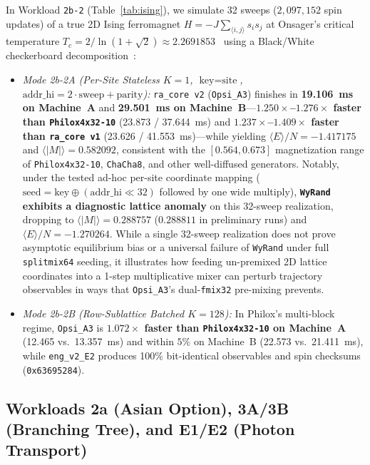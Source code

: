 \documentclass[conference]{IEEEtran}
\begin{document}
In Workload \texttt{2b-2} (Table~\ref{tab:ising}), we simulate 32 sweeps ($2{,}097{,}152$ spin updates) of a true 2D Ising ferromagnet $H = -J \sum_{\langle i,j \rangle} s_i s_j$ at Onsager's critical temperature $T_c = 2/\ln(1+\sqrt{2}) \approx 2.2691853$~\cite{onsager1944crystal} using a Black/White checkerboard decomposition~\cite{metropolis1953equation}:
\begin{itemize}
    \item \emph{Mode 2b-2A (Per-Site Stateless $K=1$, $\text{key}=\text{site}$, $\text{addr\_hi}=2\cdot\text{sweep}+\text{parity}$):} \texttt{ra\_core v2} (\texttt{Opsi\_A3}) finishes in \textbf{19.106~ms on Machine~A} and \textbf{29.501~ms on Machine~B}---\textbf{$1.250\times$--$1.276\times$ faster than \texttt{Philox4x32-10}} (23.873 / 37.644~ms) and \textbf{$1.237\times$--$1.409\times$ faster than \texttt{ra\_core v1}} (23.626 / 41.553~ms)---while yielding $\langle E \rangle / N = -1.417175$ and $\langle |M| \rangle = 0.582092$, consistent with the $[0.564, 0.673]$ magnetization range of \texttt{Philox4x32-10}, \texttt{ChaCha8}, and other well-diffused generators. Notably, under the tested ad-hoc per-site coordinate mapping ($\text{seed} = \text{key} \oplus (\text{addr\_hi} \ll 32)$ followed by one wide multiply), \textbf{\texttt{WyRand} exhibits a diagnostic lattice anomaly} on this 32-sweep realization, dropping to $\langle |M| \rangle = 0.288757$ ($0.288811$ in preliminary runs) and $\langle E \rangle / N = -1.270264$. While a single 32-sweep realization does not prove asymptotic equilibrium bias or a universal failure of \texttt{WyRand} under full \texttt{splitmix64} seeding, it illustrates how feeding un-premixed 2D lattice coordinates into a 1-step multiplicative mixer can perturb trajectory observables in ways that \texttt{Opsi\_A3}'s dual-\texttt{fmix32} pre-mixing prevents.
    \item \emph{Mode 2b-2B (Row-Sublattice Batched $K=128$):} In Philox's multi-block regime, \texttt{Opsi\_A3} is \textbf{$1.072\times$ faster than \texttt{Philox4x32-10} on Machine~A} (12.465 vs.\ 13.357~ms) and within $5\%$ on Machine~B (22.573 vs.\ 21.411~ms), while \texttt{eng\_v2\_E2} produces 100\% bit-identical observables and spin checksums (\texttt{0x63695284}).
\end{itemize}

\subsection{Workloads 2a (Asian Option), 3A/3B (Branching Tree), and E1/E2 (Photon Transport)}
\end{document}
